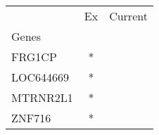 \begin{tabular}{lcc}
\toprule
{} & Ex & Current \\
Genes     &    &         \\
\midrule
FRG1CP    &  * &         \\
LOC644669 &  * &         \\
MTRNR2L1  &  * &         \\
ZNF716    &  * &         \\
\bottomrule
\end{tabular}
